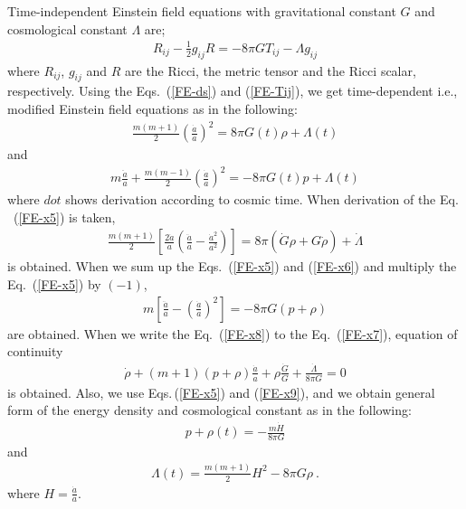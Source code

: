 \documentclass[superscriptaddress,showpacs,pre,twocolumn]{revtex4-1}
\begin{document}
Time-independent Einstein field equations with gravitational constant $G$ and cosmological constant $\Lambda$ are;
\begin{eqnarray} \label{FE-Rij}
R_{ij}-\frac{1}{2}g_{ij}R = -8 \pi G T_{ij} - \Lambda g_{ij}
\end{eqnarray}
where $R_{ij}$, $g_{ij}$ and $R$ are the Ricci, the metric tensor and the Ricci scalar, respectively. Using the Eqs.~(\ref{FE-ds}) and (\ref{FE-Tij}), we get time-dependent i.e., modified Einstein field equations as in the following:
\begin{eqnarray} \label{FE-x5}
\frac{m(m+1)}{2}\left(\frac{\dot{a}}{a}\right)^{2} = 8 \pi G(t) \rho + \Lambda(t)
\end{eqnarray}
and 
\begin{eqnarray} \label{FE-x6}
m \frac{\ddot{a}}{a} + \frac{m(m-1)}{2}\left(\frac{\dot{a}}{a}\right)^{2} = - 8 \pi G(t) p + \Lambda(t)
\end{eqnarray}
where $dot$ shows derivation according to cosmic time. When derivation of the Eq.\,~(\ref{FE-x5}) is taken,
\begin{eqnarray} \label{FE-x7}
\frac{m(m+1)}{2} \left[ \frac{2\dot{a}}{a} \left(\frac{\ddot{a}}{a} - \frac{\dot{a}^{2}}{a^{2}}\right)  \right] = 8 \pi \left(\dot{G} \rho + G \dot{\rho} \right) + \dot{\Lambda}
\end{eqnarray}
is obtained. When we sum up the Eqs.~(\ref{FE-x5}) and (\ref{FE-x6}) and multiply the Eq.~(\ref{FE-x5}) by $(-1)$, 
\begin{eqnarray} \label{FE-x8}
m \left[\frac{\ddot{a}}{a} -\left(\frac{\dot{a}}{a} \right)^{2}  \right] = -8\pi G \left(p + \rho \right) 
\end{eqnarray}
are obtained. When we write the Eq.~(\ref{FE-x8}) to the Eq.~(\ref{FE-x7}), equation of continuity 
\begin{eqnarray} \label{FE-x9}
\dot{\rho} + \left( m+1 \right) \left(p+\rho \right) \frac{\dot{a}}{a} +\rho \frac{\dot{G}}{G} + \frac{\dot{\Lambda}}{8\pi G} = 0 
\end{eqnarray}
is obtained. Also, we use Eqs.\,(\ref{FE-x5}) and (\ref{FE-x9}), and we obtain general form of the energy density and cosmological constant as in the following:
\begin{eqnarray} \label{FE-x10}
p + \rho(t) = - \frac{m\dot{H}}{8\pi G}
\end{eqnarray}
and
\begin{eqnarray} \label{FE-x11}
\Lambda(t) = \frac{m(m+1)}{2}H^{2} - 8 \pi G \rho \ .
\end{eqnarray}
where $H=\frac{\dot{a}}{a}$.
\end{document}
